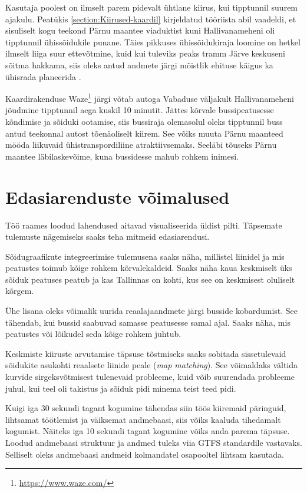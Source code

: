 Kasutaja poolest on ilmselt parem pidevalt ühtlane kiirus, kui tipptunnil  suurem ajakulu. Peatükis \ref{section:Kiirused-kaardil} kirjeldatud tööriista abil vaadeldi, et sisuliselt kogu teekond Pärnu maantee viaduktist kuni Hallivanameheni oli tipptunnil ühissõidukile punane. Täies pikkuses ühissõidukiraja loomine on hetkel ilmselt liiga suur ettevõtmine, kuid kui tuleviks peaks tramm Järve keskuseni sõitma hakkama, siis oleks  antud andmete järgi mõistlik ehituse käigus ka ühisrada planeerida \cite{err_jarve_tramm_2024}.

Kaardirakenduse Waze\footnote{\url{https://www.waze.com/}} järgi võtab autoga Vabaduse väljakult Hallivanameheni jõudmine tipptunnil aega kuskil 10 minutit. Jättes kõrvale bussipeatusesse kõndimise ja sõiduki ootamise, siis bussiraja olemasolul oleks tipptunnil buss antud teekonnal autost tõenäoliselt kiirem.  See võiks muuta Pärnu maanteed mööda liikuvaid ühistranspordiliine atraktiivsemaks. Seeläbi tõuseks Pärnu maantee läbilaskevõime, kuna bussidesse mahub rohkem inimesi.

\section{Edasiarenduste võimalused}

Töö raames loodud lahendused aitavad visualiseerida üldist pilti. Täpsemate tulemuste nägemiseks saaks teha mitmeid edasiarendusi.

Sõidugraafikute integreerimise tulemusena saaks näha, millistel liinidel ja mis peatustes toimub kõige rohkem kõrvalekaldeid. Saaks näha kaua keskmiselt üks sõiduk peatuses peatub ja kas Tallinnas on kohti, kus see on keskmisest oluliselt kõrgem.

Ühe lisana oleks võimalik uurida reaalajaandmete järgi busside kobardumist. See tähendab, kui bussid saabuvad samasse peatusesse samal ajal. Saaks näha, mis peatustes või lõikudel seda kõige rohkem juhtub.

Keskmiste kiiruste arvutamise täpsuse tõstmiseks saaks sobitada sissetulevaid sõidukite asukohti reaalsete liinide peale (\textit{map matching}). See võimaldaks vältida kurvide sirgeksvõtmisest tulenevaid probleeme, kuid võib suurendada probleeme juhul, kui teel oli takistus ja sõiduk pidi minema teist teed pidi. 

Kuigi iga 30 sekundi tagant kogumine tähendas siin töös kiiremaid päringuid, lihtsamat töötlemist ja väiksemat andmebaasi, siis võiks kaaluda tihedamalt kogumist. Näiteks iga 10 sekundi tagant kogumine võiks anda parema täpsuse. Loodud andmebaasi struktuur ja andmed tuleks viia GTFS standardile vastavaks. Selliselt oleks andmebaasi andmeid kolmandatel osapooltel lihtsam kasutada.

